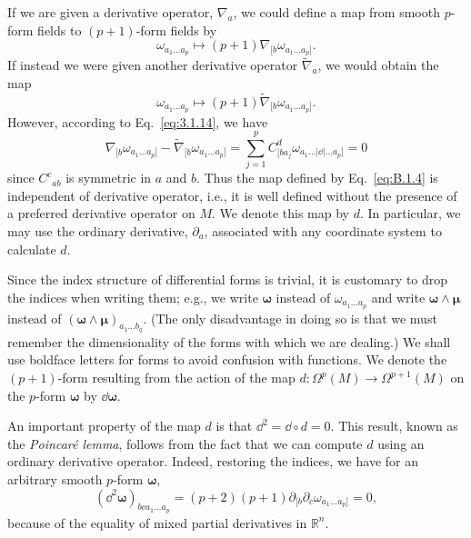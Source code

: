 If we are given a derivative operator, \(\nabla_a\), we could define a map from smooth
\(p\)-form fields to \((p+1)\)-form fields by
\begin{equation}
  \omega_{a_1\ldots a_p}\longmapsto
  (p+1)\nabla_{[b}\omega_{a_1\ldots a_p]}.
  \tag{B.1.4}\label{eq:B.1.4}
\end{equation}
If instead we were given another derivative operator \(\widetilde\nabla_a\), we would
obtain the map
\begin{equation}
  \omega_{a_1\ldots a_p}\longmapsto
  (p+1)\widetilde\nabla_{[b}\omega_{a_1\ldots a_p]}.
  \tag{B.1.5}\label{eq:B.1.5}
\end{equation}
However, according to Eq.~\eqref{eq:3.1.14}, we have
\begin{equation}
  \nabla_{[b}\omega_{a_1\ldots a_p]}
  -\widetilde\nabla_{[b}\omega_{a_1\ldots a_p]}
  =\sum_{j=1}^{p}C^d_{[ba_j}
  \omega_{a_1\ldots\lvert \dd\rvert\ldots a_p]}=0
  \tag{B.1.6}\label{eq:B.1.6}
\end{equation}
since \(C^c{}_{ab}\) is symmetric in \(a\) and \(b\). Thus the map defined by
Eq.~\eqref{eq:B.1.4} is independent of derivative operator, i.e., it is well defined
without the presence of a preferred derivative operator on \(M\). We denote this map
by \(d\). In particular, we may use the ordinary derivative, \(\partial_a\), associated
with any coordinate system to calculate \(d\).

Since the index structure of differential forms is trivial, it is customary to drop the
indices when writing them; e.g., we write \(\boldsymbol\omega\) instead of
\(\omega_{a_1\ldots a_p}\) and write \(\boldsymbol\omega\wedge\boldsymbol\mu\)
instead of \((\boldsymbol\omega\wedge\boldsymbol\mu)_{a_1\ldots b_q}\). (The only
disadvantage in doing so is that we must remember the dimensionality of the forms
with which we are dealing.) We shall use boldface letters for forms to avoid
confusion with functions. We denote the \((p+1)\)-form resulting from the action of
the map \(d:\Omega^p(M)\to\Omega^{p+1}(M)\) on the \(p\)-form
\(\boldsymbol\omega\) by \(\dd\boldsymbol\omega\).

An important property of the map \(d\) is that \(\dd^2=\dd\circ d=0\). This result,
known as the \emph{Poincar\'e lemma}, follows from the fact that we can compute \(d\)
using an ordinary derivative operator. Indeed, restoring the indices, we have for an
arbitrary smooth \(p\)-form \(\boldsymbol\omega\),
\begin{equation}
  (\dd^2\boldsymbol\omega)_{bca_1\ldots a_p}
  =(p+2)(p+1)\partial_{[b}\partial_c\omega_{a_1\ldots a_p]}=0,
  \tag{B.1.7}\label{eq:B.1.7}
\end{equation}
because of the equality of mixed partial derivatives in \(\mathbb R^n\).

